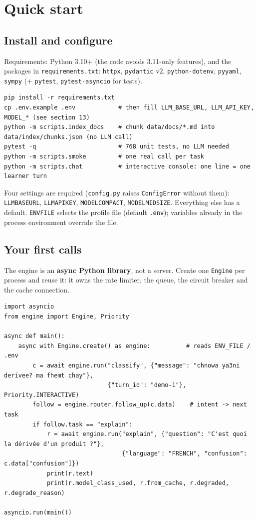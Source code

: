 \documentclass[11pt,a4paper]{article}
\renewcommand{\_}{\origus\allowbreak}
\begin{document}
\section{Quick start}

\subsection{Install and configure}

Requirements: Python 3.10+ (the code avoids 3.11-only features), and the packages in
\texttt{requirements.txt}: \texttt{httpx}, \texttt{pydantic} v2, \texttt{python-dotenv}, \texttt{pyyaml}, \texttt{sympy}
(+ \texttt{pytest}, \texttt{pytest-asyncio} for tests).

\begin{lstlisting}[style=plain]
pip install -r requirements.txt
cp .env.example .env            # then fill LLM_BASE_URL, LLM_API_KEY, MODEL_* (see section 13)
python -m scripts.index_docs    # chunk data/docs/*.md into data/index/chunks.json (no LLM call)
pytest -q                       # 768 unit tests, no LLM needed
python -m scripts.smoke         # one real call per task
python -m scripts.chat          # interactive console: one line = one learner turn
\end{lstlisting}

Four settings are required (\texttt{config.py} raises \texttt{ConfigError} without them):
\texttt{LLM\_BASE\_URL}, \texttt{LLM\_API\_KEY}, \texttt{MODEL\_COMPACT}, \texttt{MODEL\_MIDSIZE}. Everything else has a
default. \texttt{ENV\_FILE} selects the profile file (default \texttt{.env}); variables already in the process
environment override the file.

\subsection{Your first calls}

The engine is an \textbf{async Python library}, not a server. Create one \texttt{Engine} per process and
reuse it: it owns the rate limiter, the queue, the circuit breaker and the cache connection.

\begin{lstlisting}
import asyncio
from engine import Engine, Priority

async def main():
    async with Engine.create() as engine:          # reads ENV_FILE / .env
        c = await engine.run("classify", {"message": "chnowa ya3ni derivee? ma fhemt chay"},
                             {"turn_id": "demo-1"}, Priority.INTERACTIVE)
        follow = engine.router.follow_up(c.data)    # intent -> next task
        if follow.task == "explain":
            r = await engine.run("explain", {"question": "C'est quoi la dérivée d'un produit ?"},
                                 {"language": "FRENCH", "confusion": c.data["confusion"]})
            print(r.text)
            print(r.model_class_used, r.from_cache, r.degraded, r.degrade_reason)

asyncio.run(main())
\end{lstlisting}
\end{document}
